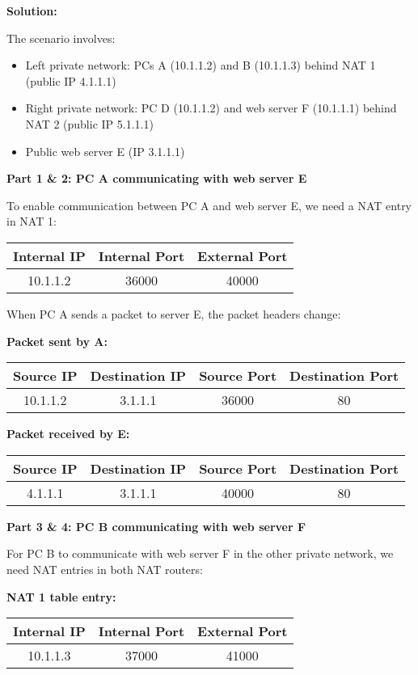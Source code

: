 \documentclass[11pt,a4paper]{article}
\begin{document}
\textbf{Solution:}

The scenario involves:
\begin{itemize}
    \item Left private network: PCs A (10.1.1.2) and B (10.1.1.3) behind NAT 1 (public IP 4.1.1.1)
    \item Right private network: PC D (10.1.1.2) and web server F (10.1.1.1) behind NAT 2 (public IP 5.1.1.1)
    \item Public web server E (IP 3.1.1.1)
\end{itemize}

\textbf{Part 1 \& 2: PC A communicating with web server E}

To enable communication between PC A and web server E, we need a NAT entry in NAT 1:

\begin{tabular}{|c|c|c|}
\hline
Internal IP & Internal Port & External Port \\
\hline
10.1.1.2 & 36000 & 40000 \\
\hline
\end{tabular}

When PC A sends a packet to server E, the packet headers change:

\textbf{Packet sent by A:}
\begin{tabular}{|c|c|c|c|}
\hline
Source IP & Destination IP & Source Port & Destination Port \\
\hline
10.1.1.2 & 3.1.1.1 & 36000 & 80 \\
\hline
\end{tabular}

\textbf{Packet received by E:}
\begin{tabular}{|c|c|c|c|}
\hline
Source IP & Destination IP & Source Port & Destination Port \\
\hline
4.1.1.1 & 3.1.1.1 & 40000 & 80 \\
\hline
\end{tabular}

\textbf{Part 3 \& 4: PC B communicating with web server F}

For PC B to communicate with web server F in the other private network, we need NAT entries in both NAT routers:

\textbf{NAT 1 table entry:}
\begin{tabular}{|c|c|c|}
\hline
Internal IP & Internal Port & External Port \\
\hline
10.1.1.3 & 37000 & 41000 \\
\hline
\end{tabular}
\end{document}
